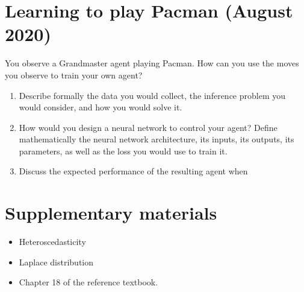 \documentclass[11pt, a4paper]{article}
\begin{document}
\newpage

\section{Learning to play Pacman (August 2020)}

You observe a Grandmaster agent playing Pacman. How can you use the moves you observe to train your own agent?

\begin{enumerate}
    \item Describe formally the data you would collect, the inference problem you would consider, and how you would solve it.
    
    \item How would you design a neural network to control your agent? Define mathematically the neural network architecture, its inputs, its outputs, its parameters, as well as the loss you would use to train it.
    
    \item Discuss the expected performance of the resulting agent when 
\end{enumerate}

\newpage

\section*{Supplementary materials}

\begin{itemize}    
    \item Heteroscedasticity
    
    
    \item Laplace distribution
    
    
    \item Chapter 18 of the reference textbook.
\end{itemize}
\end{document}
